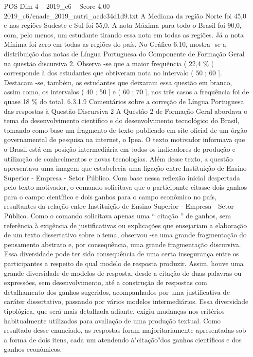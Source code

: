 \begin{textsample}{POS Dim 4 – 2019\_c6 – Score 4.00 – 2019\_c6/enade\_2019\_nutri\_acdc34d1d9.txt}
A Mediana da região Norte foi 45,0 e nas regiões Sudeste e Sul foi 55,0.
A nota Máxima para todo o Brasil foi 90,0, com, pelo menos, um estudante tirando essa nota em todas as regiões.
Já a nota Mínima foi zero em todas as regiões do país.
No Gráfico 6.10, mostra -se a distribuição das notas de Língua Portuguesa do Componente de Formação Geral na questão discursiva 2.
Observa -se que a maior frequência ( 22,4 \% ) corresponde à dos estudantes que obtiveram nota no intervalo ( 50 ; 60 ].
Destacam -se, também, os estudantes que deixaram essa questão em branco, assim como, os intervalos ( 40 ; 50 ] e ( 60 ; 70 ], nos três casos a frequência foi de quase 18 \% do total. 6.3.1.9 Comentários sobre a correção de Língua Portuguesa das respostas à Questão Discursiva 2 A Questão 2 de Formação Geral abordava o tema do desenvolvimento científico e do desenvolvimento tecnológico do Brasil, tomando como base um fragmento de texto publicado em site oficial de um órgão governamental de pesquisa na internet, o Ipea.
O texto motivador informava que o Brasil está em posição intermediária em todos os indicadores de produção e utilização de conhecimentos e novas tecnologias.
Além desse texto, a questão apresentava uma imagem que estabelecia uma ligação entre Instituição de Ensino Superior - Empresa - Setor Público.
Com base nessa reflexão inicial despertada pelo texto motivador, o comando solicitava que o participante citasse dois ganhos para o campo científico e dois ganhos para o campo econômico no país, resultantes da relação entre Instituição de Ensino Superior - Empresa - Setor Público.
Como o comando solicitava apenas uma “ citação ” de ganhos, sem referência à exigência de justificativas ou explicações que ensejariam a elaboração de um texto dissertativo sobre o tema, observou -se uma grande fragmentação do pensamento abstrato e, por consequência, uma grande fragmentação discursiva.
Essa diversidade pode ter sido consequência de uma certa insegurança entre os participantes a respeito de qual modelo de resposta produzir.
Assim, houve uma grande diversidade de modelos de resposta, desde a citação de duas palavras ou expressões, sem desenvolvimento, até a construção de respostas com detalhamento dos ganhos sugeridos, acompanhados por uma justificativa de caráter dissertativo, passando por vários modelos intermediários.
Essa diversidade tipológica, que será mais detalhada adiante, exigiu mudanças nos critérios habitualmente utilizados para avaliação de uma produção textual.
Como resultado desse enunciado, as respostas foram majoritariamente apresentadas sob a forma de dois itens, cada um atendendo à"citação"dos ganhos científicos e dos ganhos econômicos.

\end{textsample}
